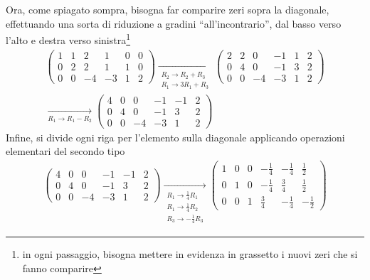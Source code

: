 \documentclass{book}
\theoremstyle{definition}
\theoremstyle{plain}
\begin{document}
Ora, come spiagato sompra, bisogna far comparire zeri sopra la diagonale, effettuando una sorta di
riduzione a gradini ``all'incontrario'', dal basso verso l'alto e destra verso sinistra\footnote{
  in ogni passaggio, bisogna mettere in evidenza in grassetto i nuovi zeri che si fanno comparire}
\begin{eqnarray*}
  \left(
  \begin{array}{ccc|ccc}
    1 & 1 & 2 & 1 & 0 & 0\\
    0 & 2 & 2 & 1 & 1 & 0\\
    0 & 0 & -4 & -3 & 1 & 2
  \end{array}\right) \underset{
  \begin{matrix}
    R_2\to R_2+R_3\\
    R_1\to 3R_1+R_3
  \end{matrix}
  }{\to}\left(
  \begin{array}{ccc|ccc}
    2 &2 & 0 & -1 & 1 & 2 \\
      0 & 4 &0 &-1 &3 &2 \\
      0 & 0 & -4 & -3 & 1&2
  \end{array}
  \right)\\
  \underset{
  R_1\to R_1-R_2
  }{\to}\left(
  \begin{array}{ccc|ccc}
    4 & 0 & 0 & -1 & -1 & 2 \\
    0 & 4 & 0 & -1 & 3 & 2 \\
    0 & 0 & -4 & -3 & 1 & 2 
  \end{array}
  \right)
\end{eqnarray*}
Infine, si divide ogni riga per l'elemento sulla diagonale applicando operazioni elementari
del secondo tipo
\begin{eqnarray*}
  \left(
  \begin{array}{ccc|ccc}
    4 & 0 & 0 & -1 & -1 & 2 \\
    0 & 4 & 0 & -1 & 3 & 2 \\
    0 & 0 & -4 & -3 & 1 & 2 
  \end{array}
  \right)\underset{
  \begin{matrix}
    R_1\to \frac{1}{4}R_1\\
    R_1\to \frac{1}{4}R_2\\
    R_3\to -\frac{1}{4}R_3
  \end{matrix}
  }{\to} \left(
  \begin{array}{ccc|ccc}
    1 & 0 & 0 & -\frac{1}{4} &-\frac{1}{4}&\frac{1}{2}\\
    0 & 1 & 0 & -\frac{1}{4} & \frac{3}{4} & \frac{1}{2}\\
    0 & 0 & 1 & \frac{3}{4} & -\frac{1}{4} & -\frac{1}{2}
  \end{array}
  \right)
\end{eqnarray*}
\end{document}
